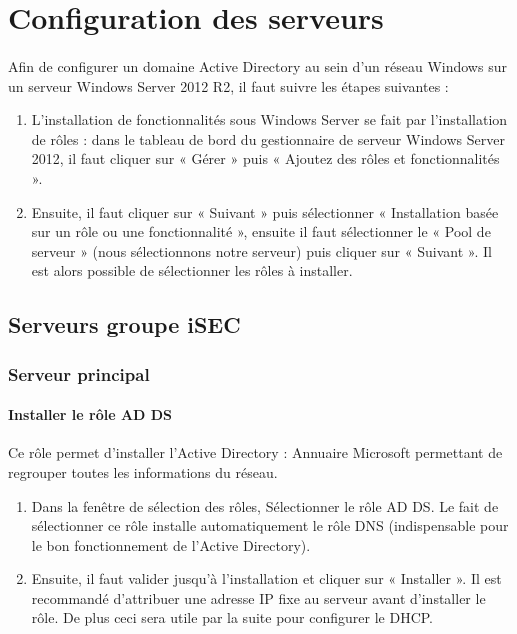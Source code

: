 \section{Configuration des serveurs}

	\paragraph{}
		Afin de configurer un domaine Active Directory au sein d’un réseau Windows sur un serveur Windows Server 2012 R2, il faut suivre les étapes suivantes :
	\begin{enumerate}
		\item L’installation de fonctionnalités sous Windows Server se fait par l’installation de rôles : dans le tableau de bord du gestionnaire de serveur Windows Server 2012, il faut cliquer sur « Gérer » puis « Ajoutez des rôles et fonctionnalités ». 
		\item Ensuite, il faut cliquer sur « Suivant » puis sélectionner « Installation basée sur un rôle ou une fonctionnalité », ensuite il faut sélectionner le « Pool de serveur » (nous sélectionnons notre serveur) puis cliquer sur « Suivant ». Il est alors possible de sélectionner les rôles à installer.
	\end{enumerate}


	\subsection{Serveurs groupe iSEC}	
		\subsubsection{Serveur principal}
			\paragraph{Installer le rôle AD DS}
				Ce rôle permet d’installer l’Active Directory : Annuaire Microsoft permettant de regrouper toutes les informations du réseau. 
				\begin{enumerate}
					\item Dans la fenêtre de sélection des rôles, Sélectionner le rôle AD DS. Le fait de sélectionner ce rôle installe automatiquement le rôle DNS (indispensable pour le bon fonctionnement de l’Active Directory).

					\item Ensuite, il faut valider jusqu’à l’installation et cliquer sur « Installer ». Il est recommandé d’attribuer une adresse IP fixe au serveur avant d’installer le rôle. De plus ceci sera utile par la suite pour configurer le DHCP.
				\end{enumerate}

